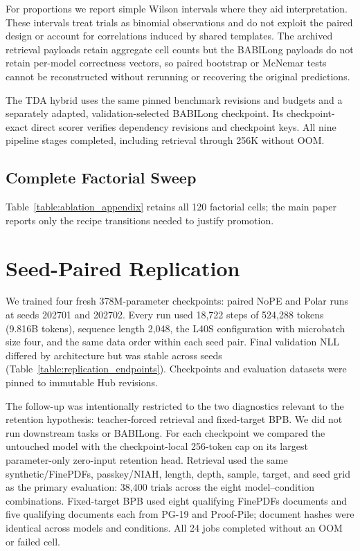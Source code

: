 For proportions we report simple Wilson intervals where they aid interpretation. These intervals treat trials as binomial observations and do not exploit the paired design or account for correlations induced by shared templates. The archived retrieval payloads retain aggregate cell counts but the BABILong payloads do not retain per-model correctness vectors, so paired bootstrap or McNemar tests cannot be reconstructed without rerunning or recovering the original predictions.

The TDA hybrid uses the same pinned benchmark revisions and budgets and a separately adapted, validation-selected BABILong checkpoint. Its checkpoint-exact direct scorer verifies dependency revisions and checkpoint keys. All nine pipeline stages completed, including retrieval through 256K without OOM.

\begin{landscape}
\section{Complete Factorial Sweep}
\label{appendix:full_ablation}

Table~\ref{table:ablation_appendix} retains all 120 factorial cells; the main paper reports only the recipe transitions needed to justify promotion.
\begingroup
\normalsize
\setlength{\tabcolsep}{5pt}

\endgroup
\end{landscape}

\section{Seed-Paired Replication}
\label{appendix:seed_replication}

We trained four fresh 378M-parameter checkpoints: paired NoPE and Polar runs at seeds 202701 and 202702. Every run used 18,722 steps of 524,288 tokens (9.816B tokens), sequence length 2,048, the L40S configuration with microbatch size four, and the same data order within each seed pair. Final validation NLL differed by architecture but was stable across seeds (Table~\ref{table:replication_endpoints}). Checkpoints and evaluation datasets were pinned to immutable Hub revisions.

The follow-up was intentionally restricted to the two diagnostics relevant to the retention hypothesis: teacher-forced retrieval and fixed-target BPB. We did not run downstream tasks or BABILong. For each checkpoint we compared the untouched model with the checkpoint-local 256-token cap on its largest parameter-only zero-input retention head. Retrieval used the same synthetic/FinePDFs, passkey/NIAH, length, depth, sample, target, and seed grid as the primary evaluation: 38,400 trials across the eight model--condition combinations. Fixed-target BPB used eight qualifying FinePDFs documents and five qualifying documents each from PG-19 and Proof-Pile; document hashes were identical across models and conditions. All 24 jobs completed without an OOM or failed cell.

